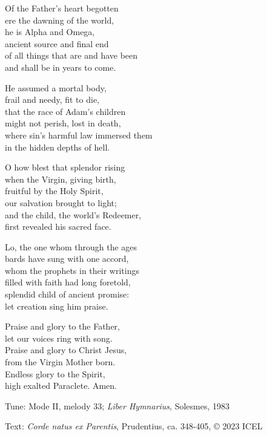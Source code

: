 \hymn

\settowidth{\versewidth}{where sin’s harmful law immersed them}

\begin{hymnverse}%
Of the Father’s heart begotten\\
ere the dawning of the world,\\
he is Alpha and Omega,\\
ancient source and final end\\
of all things that are and have been\\
and shall be in years to come.

He assumed a mortal body,\\
frail and needy, fit to die,\\
that the race of Adam’s children\\
might not perish, lost in death,\\
where sin’s harmful law immersed them\\
in the hidden depths of hell.

O how blest that splendor rising\\
when the Virgin, giving birth,\\
fruitful by the Holy Spirit,\\
our salvation brought to light;\\
and the child, the world’s Redeemer,\\
first revealed his sacred face.

Lo, the one whom through the ages\\
bards have sung with one accord,\\
whom the prophets in their writings\\
filled with faith had long foretold,\\
splendid child of ancient promise:\\
let creation sing him praise.

Praise and glory to the Father,\\
let our voices ring with song.\\
Praise and glory to Christ Jesus,\\
from the Virgin Mother born.\\
Endless glory to the Spirit,\\
high exalted Paraclete. Amen.
\end{hymnverse}


\begin{hymnsource}
Tune: Mode II, melody 33; \emph{Liber Hymnarius}, Solesmes, 1983

Text: \emph{Corde natus ex Parentis}, Prudentius, ca. 348-405, © 2023 ICEL
\end{hymnsource}
